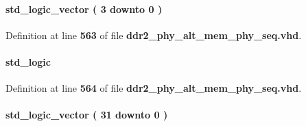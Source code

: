 \paragraph[{prog\+\_\+val}]{ {\bfseries \textcolor{comment}{std\+\_\+logic\+\_\+vector}\textcolor{vhdlchar}{ }\textcolor{vhdlchar}{(}\textcolor{vhdlchar}{ }\textcolor{vhdlchar}{ } \textcolor{vhdldigit}{3} \textcolor{vhdlchar}{ }\textcolor{keywordflow}{downto}\textcolor{vhdlchar}{ }\textcolor{vhdlchar}{ } \textcolor{vhdldigit}{0} \textcolor{vhdlchar}{ }\textcolor{vhdlchar}{)}\textcolor{vhdlchar}{ }} \hspace{0.3cm}{\ttfamily [Record]}}\label{classddr2__phy__alt__mem__phy__record__pkg_a2d9cade4df51d22a777fa3d1242c1cdb}


Definition at line {\bf 563} of file {\bf ddr2\+\_\+phy\+\_\+alt\+\_\+mem\+\_\+phy\+\_\+seq.\+vhd}.

\paragraph[{ram\+\_\+set}]{ {\bfseries \textcolor{comment}{std\+\_\+logic}\textcolor{vhdlchar}{ }} \hspace{0.3cm}{\ttfamily [Record]}}\label{classddr2__phy__alt__mem__phy__record__pkg_aba761d53764acca1099fc2b6062fa60b}


Definition at line {\bf 564} of file {\bf ddr2\+\_\+phy\+\_\+alt\+\_\+mem\+\_\+phy\+\_\+seq.\+vhd}.

\paragraph[{rdata}]{ {\bfseries \textcolor{comment}{std\+\_\+logic\+\_\+vector}\textcolor{vhdlchar}{ }\textcolor{vhdlchar}{(}\textcolor{vhdlchar}{ }\textcolor{vhdlchar}{ } \textcolor{vhdldigit}{31} \textcolor{vhdlchar}{ }\textcolor{keywordflow}{downto}\textcolor{vhdlchar}{ }\textcolor{vhdlchar}{ } \textcolor{vhdldigit}{0} \textcolor{vhdlchar}{ }\textcolor{vhdlchar}{)}\textcolor{vhdlchar}{ }} \hspace{0.3cm}{\ttfamily [Record]}}\label{classddr2__phy__alt__mem__phy__record__pkg_acd6d95d1b2642f17d5ac71c26afbbb64}


